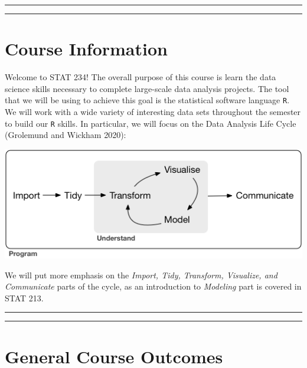 \documentclass[
]{book}
\begin{document}
\begin{center}\rule{0.5\linewidth}{0.5pt}\end{center}

\begin{center}\rule{0.5\linewidth}{0.5pt}\end{center}

\hypertarget{course-information}{%
\section{Course Information}\label{course-information}}

Welcome to STAT 234! The overall purpose of this course is learn the data science skills necessary to complete large-scale data analysis projects. The tool that we will be using to achieve this goal is the statistical software language \texttt{R}. We will work with a wide variety of interesting data sets throughout the semester to build our \texttt{R} skills. In particular, we will focus on the Data Analysis Life Cycle (Grolemund and Wickham 2020):

\includegraphics{other/data-science.png}

We will put more emphasis on the \emph{Import, Tidy, Transform, Visualize, and Communicate} parts of the cycle, as an introduction to \emph{Modeling} part is covered in STAT 213.

\begin{center}\rule{0.5\linewidth}{0.5pt}\end{center}

\begin{center}\rule{0.5\linewidth}{0.5pt}\end{center}

\hypertarget{general-course-outcomes}{%
\section{General Course Outcomes}\label{general-course-outcomes}}
\end{document}
